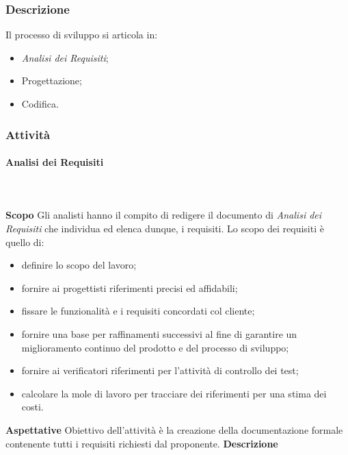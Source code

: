 	\subsubsection{Descrizione}
	Il processo di sviluppo si articola in:
	\begin{itemize}
		\item \textit{Analisi dei Requisiti};
		\item Progettazione;
		\item Codifica.
	\end{itemize}
	\subsubsection{Attività}
		\paragraph{Analisi dei Requisiti} \mbox{}\\ \mbox{}\\
			\textbf{Scopo} \newline \newline
			Gli analisti hanno il compito di redigere il documento di
			\textit{Analisi dei Requisiti} che individua ed elenca dunque, i requisiti.
			Lo scopo dei requisiti è quello di:
			\begin{itemize}
				\item definire lo scopo del lavoro;
				\item fornire ai progettisti riferimenti precisi ed affidabili;
				\item fissare le funzionalità e i requisiti concordati col cliente;
				\item fornire  una  base  per  raffinamenti  successivi  al  fine  di  garantire  un miglioramento continuo del prodotto e del processo di sviluppo;
				\item fornire ai verificatori riferimenti per l'attività di controllo dei test;
				\item calcolare la mole di lavoro per tracciare dei riferimenti per una stima dei costi.
			\end{itemize}
			\textbf{Aspettative} \newline \newline
			Obiettivo dell'attività è la creazione della documentazione formale contenente tutti i
			requisiti richiesti dal proponente. \newline \newline
			\textbf{Descrizione} \newline \newline
